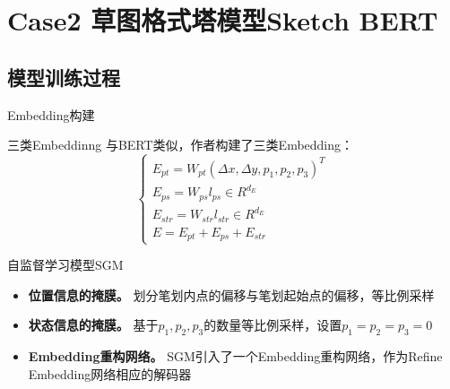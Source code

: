 \documentclass[UTF-8,fontset = none]{ctexbeamer}
\begin{document}
\section{Case2 草图格式塔模型Sketch BERT}

\subsection{模型训练过程}

\begin{frame}{Embedding构建}
    \begin{block}{三类Embeddinng}
        与BERT类似，作者构建了三类Embedding：
        \begin{equation*}
            \begin{cases}
             E_{pt} = W_{pt}(\Delta x,\Delta y,p_{1},p_{2},p_{3})^{T}\\
             E_{ps} = W_{ps}l_{ps} \in R^{d_{E}}\\
             E_{str} = W_{str}l_{str} \in R^{d_{E}}\\
             E=E_{pt}+E_{ps}+E_{str}
            \end{cases} 
            \label{eq:1}
        \end{equation*}
    \end{block}
\end{frame}

\begin{frame}{自监督学习模型SGM}
    \begin{itemize}
        \item \textbf{位置信息的掩膜。} 划分笔划内点的偏移与笔划起始点的偏移，等比例采样\cite{2020Sketch}
        \item \textbf{状态信息的掩膜。} 基于$p_{1}, p_{2}, p_{3}$的数量等比例采样，设置$p_{1}=p_{2}=p_{3}=0$
        \item \textbf{Embedding重构网络。} SGM引入了一个Embedding重构网络，作为Refine Embedding网络相应的解码器
    \end{itemize}
\end{frame}
\end{document}
